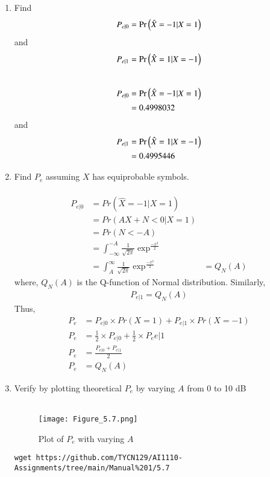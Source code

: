 \documentclass[journal,12pt,twocolumn]{IEEEtran}
\renewcommand\thesection{\arabic{section}}
\begin{document}
\begin{enumerate}[label=\thesection.\arabic*
,ref=\thesection.\theenumi]
\item Find 
\begin{equation}
	P_{e|0} = \Pr\left(\hat{X} = -1|X=1\right)
\end{equation}
and 
\begin{equation}
	P_{e|1} = \Pr\left(\hat{X} = 1|X=-1\right)
\end{equation}
\solution\\
\begin{align}
	P_{e|0} &= \Pr\left(\hat{X} = -1|X=1\right)\\
	&= 0.4998032
\end{align}
and 
\begin{align}
	P_{e|1} &= \Pr\left(\hat{X} = 1|X=-1\right)\\
	&= 0.4995446
\end{align}

\item Find $P_e$ assuming $X$ has equiprobable symbols.\\
\solution\\
\begin{align}
    P_{e|0} &= Pr(\hat{X} = -1 | X = 1)\\
    &= Pr(AX + N < 0 | X = 1)\\
    &= Pr(N < -A)\\
    &= \int_{-\infty}^{-A}\frac{1}{\sqrt{2\pi}}\exp^{\frac{-x^2}{2}}\\
    &= \int_{A}^{\infty}\frac{1}{\sqrt{2\pi}}\exp^{\frac{-x^2}{2}}
    &= Q_N(A)
\end{align}
where, $Q_N(A)$ is the Q-function of Normal distribution. Similarly,
\begin{align}
    P_{e|1} = Q_N(A)
\end{align}
Thus,
\begin{align}
    P_e &= P_{e|0} \times Pr(X = 1) + P_{e|1} \times Pr(X = -1)\\
    P_e &= \frac{1}{2}\times P_{e|0} + \frac{1}{2}\times P_e{e|1}\\
    P_e &= \frac{P_{e|0} + P_{e|1}}{2}\\
    P_e &= Q_N(A)
\end{align}

\item Verify by plotting theoretical $P_e$ by varying $A$ from 0 to 10 dB\\
\solution\\
\begin{figure}[h!]
    \centering
    \texttt{[image: Figure\_5.7.png]}
    \caption{Plot of $P_e$ with varying $A$}
    \label{fig:my_label}
\end{figure}
\begin{lstlisting}
wget https://github.com/TYCN129/AI1110-Assignments/tree/main/Manual%201/5.7
\end{lstlisting}


\end{enumerate}
\end{document}
